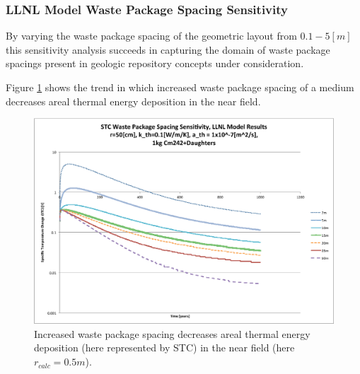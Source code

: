 

\begin{frame}[ctb!]
\frametitle{LLNL Model Waste Package Spacing Sensitivity}

By varying the waste package spacing of the geometric layout from $0.1-5 [m]$
this sensitivity analysis succeeds in capturing the domain of 
waste package spacings present in geologic repository concepts under 
consideration. 

Figure \ref{fig:Cm242spacing_sens} shows the trend in which increased waste package spacing of a medium decreases areal thermal energy 
deposition in the near field.

\begin{figure}[htbp!]
\begin{center}
\includegraphics[height=0.7\textheight]{./thermal_demonstration/spacing/Cm242spacing_sens.eps}
\end{center}
\caption[$K_{th}$ Sensitivity to $s$]{Increased waste package 
spacing decreases areal thermal energy deposition 
(here represented by STC) in the near field (here $r_{calc} = 0.5m$).}
\label{fig:Cm242spacing_sens}
\end{figure}
\end{frame}


